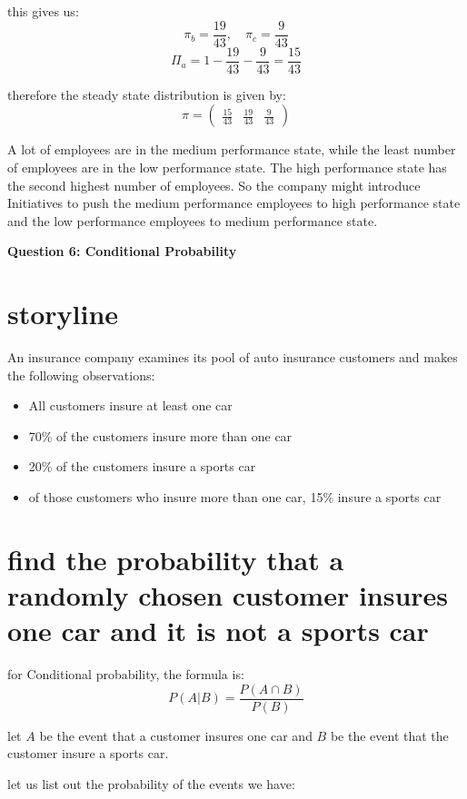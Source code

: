 \documentclass{article}
\begin{document}
this gives us:
\[\pi_b = \frac{19}{43}, \quad \pi_c = \frac{9}{43}\]
\[\Pi_a = 1 - \frac{19}{43} - \frac{9}{43} = \frac{15}{43}\]

therefore the steady state distribution is given by:
\[\pi = \begin{pmatrix}\frac{15}{43}&\frac{19}{43}&\frac{9}{43}\end{pmatrix}\]


A lot of employees are in the medium performance state, while the least number of employees are in the low performance state. The high performance state has the second highest number of employees. So the company might introduce Initiatives to push the medium performance employees to high performance state and the low performance employees to medium performance state.

\begin{center}
    \large \textbf{Question 6: Conditional Probability}
\end{center}
\section{storyline}
An insurance company examines its pool of auto insurance customers and makes the following observations:
\begin{itemize}
    \item All customers insure at least one car
    \item 70\% of the customers insure more than one car
    \item 20\% of the customers insure a sports car
    \item of those customers who insure more than one car, 15\% insure a sports car
\end{itemize}

\section{find the probability that a randomly chosen customer insures one car and it is not a sports car}

for Conditional probability, the formula is:
\[P(A|B) = \frac{P(A \cap B)}{P(B)}\]

let \(A\) be the event that a customer insures one car and \(B\) be the event that the customer insure a sports car.

let us list out the probability of the events we have:
\end{document}
